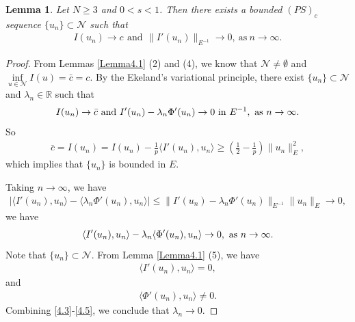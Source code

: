 \documentclass[12pt,a4paper,reqno]{amsart}
\numberwithin{equation}{section}
\newtheorem{lemma}{Lemma}[section]
\begin{document}
\begin{lemma}\label{Lemma4.2}
Let $N\geqslant3$ and $0<s<1$.
Then there exists a bounded $(PS)_{c}$ sequence $\{u_{n}\}\subset \mathcal{N}$ such that
\begin{equation*}
\begin{aligned}
I(u_{n})\rightarrow c
\ \,\mathrm{and}\ \,
\|I'(u_n)\|_{E^{-1}}\rightarrow 0,\ \mathrm{as}\ n\rightarrow \infty.
\end{aligned}
\end{equation*}
\end{lemma}


\begin{proof}
From Lemmas \ref{Lemma4.1} (2) and (4), we know that $\mathcal{N}\not=\emptyset$ and $\inf\limits_{u\in \mathcal{N}}I(u)=\bar{c}=c$.
By the Ekeland's variational principle, there exist $\{u_{n}\}\subset \mathcal{N}$ and
$\lambda_{n}\in \mathbb{R}$ such that
\begin{equation*}
\begin{aligned}
I(u_{n})\rightarrow \bar{c}
~\mathrm{and}~I'(u_{n})-\lambda_{n}\Phi'(u_{n})\rightarrow 0
~\mathrm{in}~E^{-1},
~{\rm as}~n\to\infty.
\end{aligned}
\end{equation*}
So
\begin{equation*}
\begin{aligned}
\bar{c}=I(u_{n})
=I(u_{n})
-\frac{1}{p}\langle I'(u_{n}),u_{n}\rangle
\geqslant\left(\frac{1}{2}-\frac{1}{p}\right)
\|u_{n}\|_{E}^{2},
\end{aligned}
\end{equation*}
which implies that $\{u_{n}\}$ is bounded in $E$.

Taking $n\to\infty$, we have
\begin{equation*}
\begin{aligned}
|\langle I'(u_{n}),u_{n}\rangle-\langle\lambda_{n}\Phi'(u_{n}),u_{n}\rangle|
\leqslant \|I'(u_{n})
-\lambda_{n}\Phi'(u_{n})\|_{E^{-1}}\|u_{n}\|_{E}
\rightarrow 0,
\end{aligned}
\end{equation*}
we have
\begin{equation}\label{4.3}
\begin{aligned}
\langle I'(u_{n}),u_{n}\rangle
-\lambda_{n}\langle \Phi'(u_{n}),u_{n}\rangle\rightarrow 0,
~{\rm as}~n\to\infty.
\end{aligned}
\end{equation}
Note that $\{u_{n}\}\subset \mathcal{N}$. From Lemma \ref{Lemma4.1} (5), we have
\begin{equation}\label{4.4}
\begin{aligned}
\langle I'(u_{n}),u_{n}\rangle=0,
\end{aligned}
\end{equation}
and
\begin{equation}\label{4.5}
\begin{aligned}
\langle \Phi'(u_{n}),u_{n}\rangle\not=0.
\end{aligned}
\end{equation}
Combining \eqref{4.3}-\eqref{4.5},
we conclude that $\lambda_{n}\rightarrow0$.


\end{proof}
\end{document}
